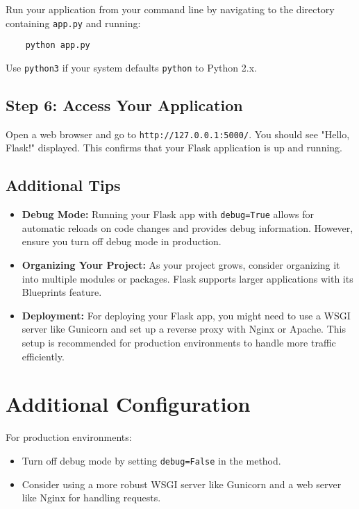 Run your application from your command line by navigating to the directory containing \texttt{app.py} and running:

\begin{verbatim}
	python app.py
\end{verbatim}

Use \texttt{python3} if your system defaults \texttt{python} to Python 2.x.

\subsection{Step 6: Access Your Application}

Open a web browser and go to \texttt{http://127.0.0.1:5000/}. You should see "Hello, Flask!" displayed. This confirms that your Flask application is up and running.

\subsection{Additional Tips}

\begin{itemize}
	\item \textbf{Debug Mode:} Running your Flask app with \texttt{debug=True} allows for automatic reloads on code changes and provides debug information. However, ensure you turn off debug mode in production.
	\item \textbf{Organizing Your Project:} As your project grows, consider organizing it into multiple modules or packages. Flask supports larger applications with its Blueprints feature.
	\item \textbf{Deployment:} For deploying your Flask app, you might need to use a WSGI server like Gunicorn and set up a reverse proxy with Nginx or Apache. This setup is recommended for production environments to handle more traffic efficiently.
\end{itemize}

\section*{Additional Configuration}

For production environments:

\begin{itemize}
	\item Turn off debug mode by setting \texttt{debug=False} in the  method.
	\item Consider using a more robust WSGI server like Gunicorn and a web server like Nginx for handling requests.
\end{itemize}

